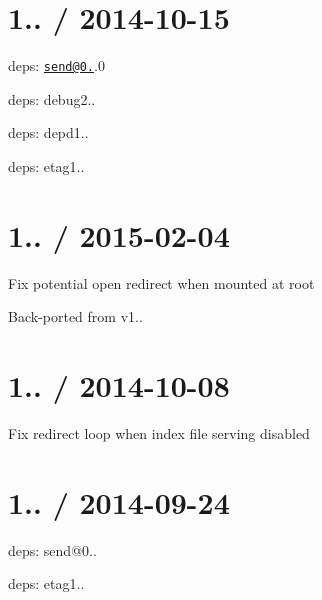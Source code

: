 \section*{1.. / 2014-\/10-\/15 }


\begin{DoxyItemize}
\item deps\+: \href{mailto:send@0.10}{\tt send@0.}.0
\begin{DoxyItemize}
\item deps\+: debug2..
\item deps\+: depd1..
\item deps\+: etag1..
\end{DoxyItemize}
\end{DoxyItemize}

\section*{1.. / 2015-\/02-\/04 }


\begin{DoxyItemize}
\item Fix potential open redirect when mounted at root
\begin{DoxyItemize}
\item Back-\/ported from v1..
\end{DoxyItemize}
\end{DoxyItemize}

\section*{1.. / 2014-\/10-\/08 }


\begin{DoxyItemize}
\item Fix redirect loop when index file serving disabled
\end{DoxyItemize}

\section*{1.. / 2014-\/09-\/24 }


\begin{DoxyItemize}
\item deps\+: send@0..
\begin{DoxyItemize}
\item deps\+: etag1..
\end{DoxyItemize}
\end{DoxyItemize}

